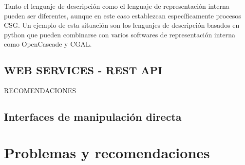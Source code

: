 Tanto el lenguaje de descripción como el lenguaje de representación interna pueden ser diferentes, aunque en este caso establezcan específicamente procesos CSG. Un ejemplo de esta situación son los lenguajes de descripción basados en python que pueden combinarse con varios softwares de representación interna como OpenCascade y CGAL.

\clearpage


\clearpage






\subsection{WEB SERVICES - REST API}
RECOMENDACIONES

\subsection{Interfaces de manipulación directa}




\section{Problemas y recomendaciones
}